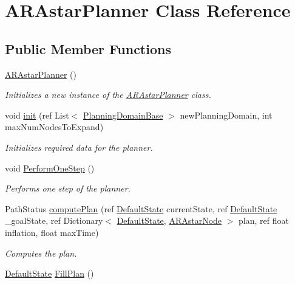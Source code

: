 \hypertarget{class_a_r_astar_planner}{\section{A\-R\-Astar\-Planner Class Reference}
\label{class_a_r_astar_planner}
}
\subsection*{Public Member Functions}
\begin{DoxyCompactItemize}
\item 
\hyperlink{class_a_r_astar_planner_ac104ddca5d41bcceef98695c684d6fd1}{A\-R\-Astar\-Planner} ()
\begin{DoxyCompactList}\small\item\em Initializes a new instance of the \hyperlink{class_a_r_astar_planner}{A\-R\-Astar\-Planner} class. \end{DoxyCompactList}\item 
void \hyperlink{class_a_r_astar_planner_adb738f472ed71c2ef472a4dcd5c4a5f9}{init} (ref List$<$ \hyperlink{class_planning_domain_base}{Planning\-Domain\-Base} $>$ new\-Planning\-Domain, int max\-Num\-Nodes\-To\-Expand)
\begin{DoxyCompactList}\small\item\em Initializes required data for the planner. \end{DoxyCompactList}\item 
void \hyperlink{class_a_r_astar_planner_a02a2eeca8d5662b6179d003d3b21be8c}{Perform\-One\-Step} ()
\begin{DoxyCompactList}\small\item\em Performs one step of the planner. \end{DoxyCompactList}\item 
Path\-Status \hyperlink{class_a_r_astar_planner_aef22ec1bfe13cad24e8c7f0f0eb526ba}{compute\-Plan} (ref \hyperlink{class_default_state}{Default\-State} current\-State, ref \hyperlink{class_default_state}{Default\-State} \-\_\-goal\-State, ref Dictionary$<$ \hyperlink{class_default_state}{Default\-State}, \hyperlink{class_a_r_astar_node}{A\-R\-Astar\-Node} $>$ plan, ref float inflation, float max\-Time)
\begin{DoxyCompactList}\small\item\em Computes the plan. \end{DoxyCompactList}\item 
\hyperlink{class_default_state}{Default\-State} \hyperlink{class_a_r_astar_planner_aa6fea4b120f0db2d5b23045279d51bb5}{Fill\-Plan} ()

\end{DoxyCompactItemize}
